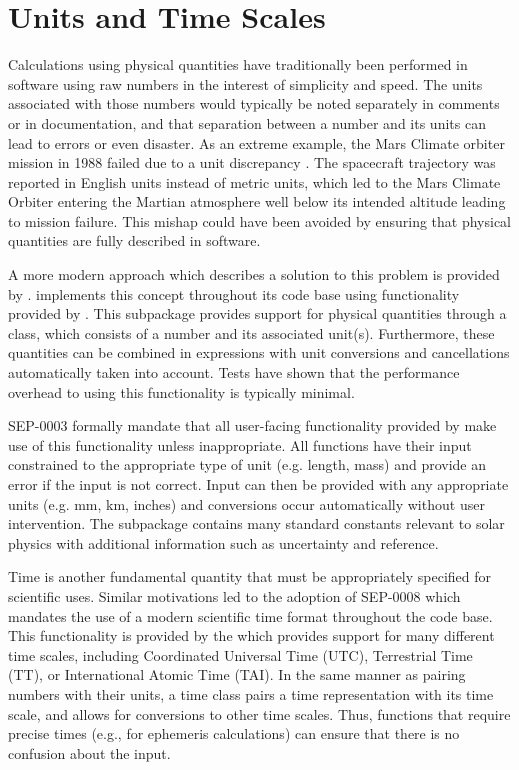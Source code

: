 \section{Units and Time Scales}
\label{sec:units}

Calculations using physical quantities have traditionally been performed in software using raw numbers in the interest of simplicity and speed.
The units associated with those numbers would typically be noted separately in comments or in documentation, and that separation between a number and its units can lead to errors or even disaster.
As an extreme example, the Mars Climate orbiter mission in 1988 failed due to a unit discrepancy \citep{mco_mishap_report}.
The spacecraft trajectory was reported in English units instead of metric units, which led to the Mars Climate Orbiter entering the Martian atmosphere well below its intended altitude leading to mission failure.
This mishap could have been avoided by ensuring that physical quantities are fully described in software.

A more modern approach which describes a solution to this problem is provided by \citet{Damevski2009}.
\sunpypkg implements this concept throughout its code base using  functionality provided by .
This subpackage provides support for physical quantities through a class, which consists of a number and its associated unit(s).
Furthermore, these quantities can be combined in expressions with unit conversions and cancellations automatically taken into account.
Tests have shown that the performance overhead to using this functionality is typically minimal.

SEP-0003 formally mandate that all user-facing functionality provided by \sunpypkg make use of this functionality unless inappropriate.
All functions have their input constrained to the appropriate type of unit (e.g. length, mass) and provide an error if the input is not correct.
Input can then be provided with any appropriate units (e.g. mm, km, inches) and conversions occur automatically without user intervention.
The  subpackage contains many standard constants relevant to solar physics with additional information such as uncertainty and reference.

Time is another fundamental quantity that must be appropriately specified for scientific uses.
Similar motivations led to the adoption of SEP-0008 which mandates the use of a modern scientific time format throughout the \sunpypkg code base.
This functionality is provided by the  which provides support for many different time scales, including Coordinated Universal Time (UTC), Terrestrial Time (TT), or International Atomic Time (TAI).
In the same manner as pairing numbers with their units, a time class pairs a time representation with its time scale, and allows for conversions to other time scales.
Thus, functions that require precise times (e.g., for ephemeris calculations) can ensure that there is no confusion about the input.
